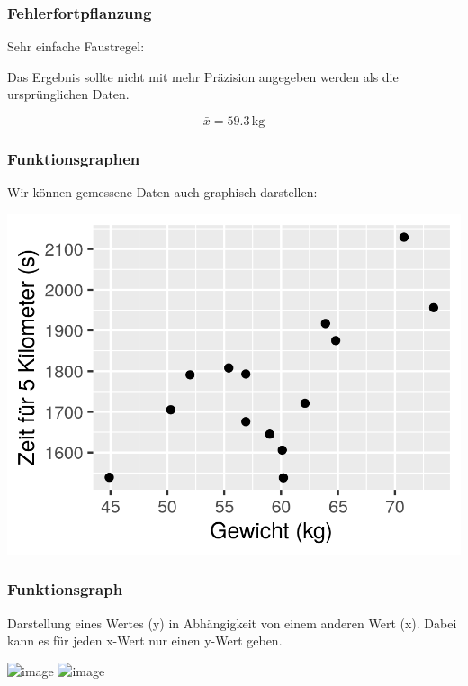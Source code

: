 \documentclass{beamer}
\begin{document}
\begin{frame}
\frametitle{Fehlerfortpflanzung}

Sehr einfache Faustregel:

Das Ergebnis sollte nicht mit mehr Präzision angegeben werden als die ursprünglichen Daten. 

\pause

\[
\bar{x} = 59.3\,\text{kg}
\]

\end{frame}



\begin{frame}
\frametitle{Funktionsgraphen}

Wir können  gemessene Daten auch graphisch darstellen:

\begin{center}
\includegraphics{zeit_vs_gewicht.png}
\end{center}

\end{frame}


\begin{frame}
\frametitle{Funktionsgraph}

Darstellung eines Wertes (y) in Abhängigkeit von einem anderen Wert (x). Dabei kann es für jeden x-Wert nur einen y-Wert geben. 

\begin{center}
\includegraphics<1>{zeit_vs_gewicht_regression.png}
\includegraphics<2>{/home/melanie/Work/pictures/physics/function.png}
\end{center}

\end{frame}
\end{document}
